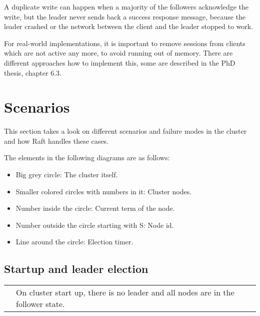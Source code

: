 A duplicate write can happen when a majority of the followers acknowledge the write, but the leader never sends back a success response message, because the leader crashed or the network between the client and the leader stopped to work.

For real-world implementations, it is important to remove sessions from clients which are not active any more, to avoid running out of memory. There are different approaches how to implement this, some are described in the PhD thesis\cite{raft_phd_thesis}, chapter 6.3.

\section{Scenarios}
This section takes a look on different scenarios and failure modes in the cluster and how Raft handles these cases.

The elements in the following diagrams are as follows:
\begin{itemize}
    \item Big grey circle: The cluster itself.
    \item Smaller colored circles with numbers in it: Cluster nodes.
    \item Number inside the circle: Current term of the node.
    \item Number outside the circle starting with S: Node id.
    \item Line around the circle: Election timer.
\end{itemize}


\newcommand{\raftscope}[2]{
\begin{tabular}{ p{125px}   m{11.5cm}  }
\raisebox{-\totalheight+50px}{
  \def\svgwidth{120}
  \fontsize{9pt}{11pt}\selectfont
  
} & #2 
\end{tabular}
}

\newcommand{\raftscopedata}[2]{
\begin{tabular}{ p{250px}   p{7cm}  }
\raisebox{-\totalheight+25px}{
  \def\svgwidth{250}
  \fontsize{9pt}{11pt}\selectfont
  
} & #2 
\end{tabular}
}

\subsection{Startup and leader election}


\raftscope{scenarios/election/40.pdf_tex}{
On cluster start up, there is no leader and all nodes are in the follower state.
}

